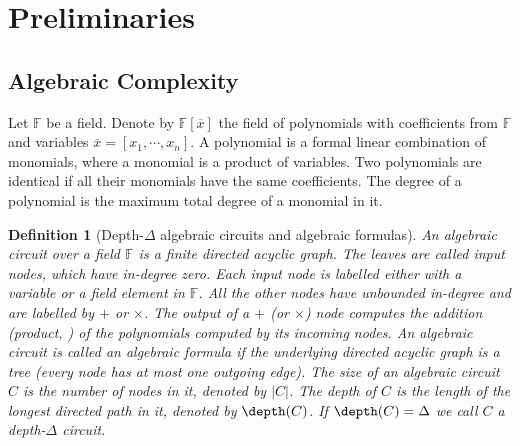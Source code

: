 \documentclass[11pt,letter]{article}
\newtheorem{definition}[theorem]{Definition}
\theoremstyle{remark} %
\begin{document}
{%




    \section{Preliminaries}





    \subsection{Algebraic Complexity}
    Let $\mathbb{F}$ be a field. Denote by $\mathbb{F}[\overline{x}]$ the field of polynomials with coefficients from $\mathbb{F}$ and variables $\overline{x}=[x_1,\cdots,x_n]$. A polynomial is a formal linear combination of monomials, where a monomial is a product of variables. Two polynomials are identical if all their monomials have the same coefficients. The degree of a polynomial is the maximum total degree of a monomial in it.
    
    
    \begin{definition}[Depth-$\Delta$ algebraic circuits and algebraic formulas]
        An \emph{algebraic circuit} over a field $\mathbb{F}$ is a finite directed acyclic graph. The leaves are called input nodes, which have in-degree zero. Each input node is labelled either with a variable or a field element in $\mathbb{F}$. All the other nodes have unbounded in-degree and are labelled by  $+$ or $\times$. The output of a $+$ (or $\times$) node computes the addition (product, \resp) of the polynomials computed by its incoming nodes. An algebraic circuit is called an algebraic \emph{formula} if the underlying directed acyclic graph is a tree (every node has at most one outgoing edge). The \emph{size} of an algebraic circuit $C$ is the number of nodes in it, denoted by $|C|$. The \emph{depth} of $C$ is the length of the longest directed path in it, denoted by $\depth(C)$. If $\depth(C)=\Delta$ we call $C$ a \emph{depth-$\Delta$ circuit}.
    \end{definition}


  

}
\end{document}
